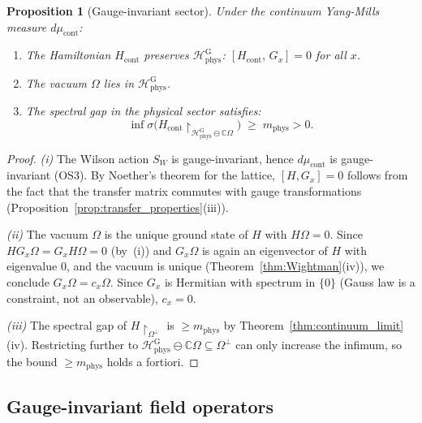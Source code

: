 \documentclass[11pt,a4paper]{amsart}
\newtheorem{proposition}[theorem]{Proposition}
\theoremstyle{definition}
\newcommand{\C}{\mathbb{C}}
\begin{document}
\begin{proposition}[Gauge-invariant sector]
\label{prop:gauge_inv_sector}
Under the continuum Yang-Mills measure $d\mu_{\mathrm{cont}}$:
\begin{enumerate}[label=(\roman*)]
\item The Hamiltonian $H_{\mathrm{cont}}$ preserves
      $\mathcal{H}_{\mathrm{phys}}^{\mathrm{G}}$:
      $[H_{\mathrm{cont}},\,G_x] = 0$ for all $x$.
\item The vacuum $\Omega$ lies in $\mathcal{H}_{\mathrm{phys}}^{\mathrm{G}}$.
\item The spectral gap in the physical sector satisfies:
      \[
        \inf\sigma\bigl(H_{\mathrm{cont}}
          \!\restriction_{\mathcal{H}_{\mathrm{phys}}^{\mathrm{G}} \ominus \C\Omega}\bigr)
        \;\ge\; m_{\mathrm{phys}} > 0.
      \]
\end{enumerate}
\end{proposition}
\begin{proof}
\emph{(i)} The Wilson action $S_W$ is gauge-invariant, hence $d\mu_{\mathrm{cont}}$
is gauge-invariant (OS3).  By Noether's theorem for the lattice, $[H, G_x] = 0$
follows from the fact that the transfer matrix commutes with gauge transformations
(Proposition~\ref{prop:transfer_properties}(iii)).

\emph{(ii)} The vacuum $\Omega$ is the unique ground state of $H$ with $H\Omega = 0$.
Since $H G_x \Omega = G_x H\Omega = 0$ (by~(i)) and $G_x\Omega$ is again an
eigenvector of $H$ with eigenvalue 0, and the vacuum is unique (Theorem~\ref{thm:Wightman}(iv)),
we conclude $G_x\Omega = c_x\Omega$.  Since $G_x$ is Hermitian with spectrum
in $\{0\}$ (Gauss law is a constraint, not an observable), $c_x = 0$.

\emph{(iii)} The spectral gap of $H\restriction_{\Omega^\perp}$ is $\ge m_{\mathrm{phys}}$
by Theorem~\ref{thm:continuum_limit}(iv).  Restricting further to
$\mathcal{H}_{\mathrm{phys}}^{\mathrm{G}} \ominus \C\Omega \subseteq \Omega^\perp$
can only increase the infimum, so the bound $\ge m_{\mathrm{phys}}$ holds a fortiori.
\end{proof}

\subsection{Gauge-invariant field operators}
\label{sec:field_ops}
\end{document}
